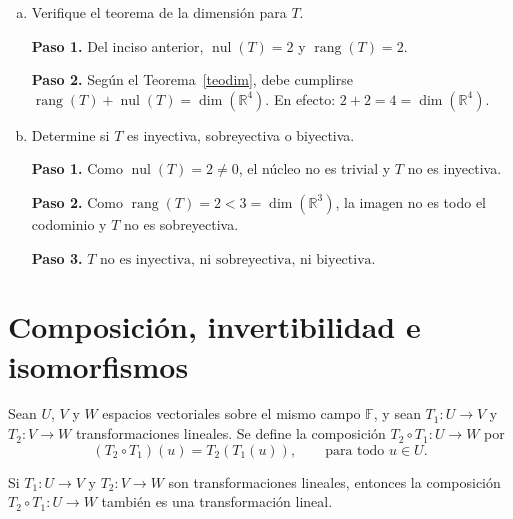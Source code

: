 \begin{example}
\begin{enumerate}[(a)]
\begin{myproof}
\textbf{Paso 4.} $\boxed{\operatorname{nul}(T) = 2 \text{ y } \operatorname{rang}(T) = 2}$, con las bases anteriores.
\end{myproof}

\item Verifique el teorema de la dimensión para $T$.
\begin{myproof}
\textbf{Paso 1.} Del inciso anterior, $\operatorname{nul}(T) = 2$ y $\operatorname{rang}(T) = 2$.

\textbf{Paso 2.} Según el Teorema~\ref{teodim}, debe cumplirse $\operatorname{rang}(T) + \operatorname{nul}(T) = \dim(\mathbb{R}^4)$. En efecto: $\boxed{2 + 2 = 4 = \dim(\mathbb{R}^4)}$.
\end{myproof}

\item Determine si $T$ es inyectiva, sobreyectiva o biyectiva.
\begin{myproof}
\textbf{Paso 1.} Como $\operatorname{nul}(T) = 2 \neq 0$, el núcleo no es trivial y $T$ no es inyectiva.

\textbf{Paso 2.} Como $\operatorname{rang}(T) = 2 < 3 = \dim(\mathbb{R}^3)$, la imagen no es todo el codominio y $T$ no es sobreyectiva.

\textbf{Paso 3.} $\boxed{T \text{ no es inyectiva, ni sobreyectiva, ni biyectiva}}$.
\end{myproof}
\end{enumerate}
\end{example}


\section{Composición, invertibilidad e isomorfismos}

\begin{definition}
Sean $U$, $V$ y $W$ espacios vectoriales sobre el mismo campo $\mathbb{F}$, y sean $T_1: U \to V$ y $T_2: V \to W$ transformaciones lineales. Se define la composición $T_2 \circ T_1: U \to W$ por
\[
(T_2 \circ T_1)(u) = T_2(T_1(u)), \qquad \text{para todo } u \in U.
\]
\end{definition}

\begin{theorem}
Si $T_1: U \to V$ y $T_2: V \to W$ son transformaciones lineales, entonces la composición $T_2 \circ T_1: U \to W$ también es una transformación lineal.
\end{theorem}

